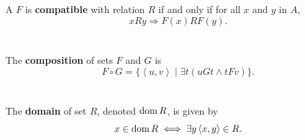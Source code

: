 \documentclass{report}
\newcommand{\pair}[1]{\left< #1 \right>}
\begin{document}
\begin{definition}


\end{definition}

\section{}%

A  $F$ is \textbf{compatible} with relation $R$ if and
  only if for all $x$ and $y$ in $A$,
  $$xRy \Rightarrow F(x)RF(y).$$

\begin{definition}


\end{definition}

\section{}%

The \textbf{composition} of sets $F$ and $G$ is
  $$F \circ G = \{\pair{u, v} \mid \exists t(uGt \land tFv)\}.$$

\begin{definition}


\end{definition}

\section{}%

The \textbf{domain} of set $R$, denoted $\mathop{\text{dom}}{R}$, is given by
  $$x \in \dom{R} \iff \exists y \pair{x, y} \in R.$$

\begin{definition}


\end{definition}

\section{}%
\end{document}

